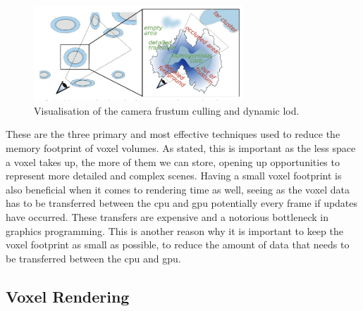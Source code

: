 \documentclass[titlepage]{article}
\begin{document}
\begin{figure}[htp]
  \centering
  \includegraphics[width=0.7\textwidth]{frustum.png}
  \caption{Visualisation of the camera frustum culling and dynamic \gls{lod}.}
\end{figure}
\FloatBarrier

These are the three primary and most effective techniques used to reduce the memory footprint of voxel volumes. As stated, this is important as the less space a voxel takes up, the more of them we can store, opening up opportunities to represent more detailed and complex scenes. Having a small voxel footprint is also beneficial when it comes to rendering time as well, seeing as the voxel data has to be transferred between the \gls{cpu} and \gls{gpu} potentially every frame if updates have occurred. These transfers are expensive and a notorious bottleneck in graphics programming. This is another reason why it is important to keep the voxel footprint as small as possible, to reduce the amount of data that needs to be transferred between the \gls{cpu} and \gls{gpu}.

\subsection{Voxel Rendering}
\end{document}
